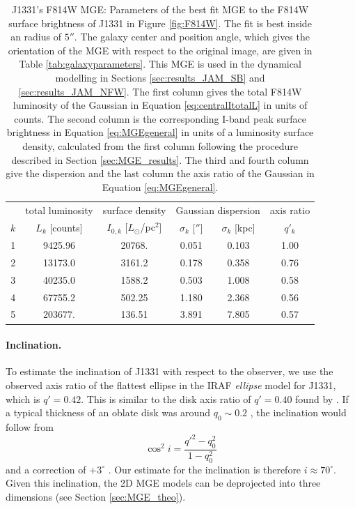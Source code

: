 \begin{table}
\centering
\caption{J1331's F814W MGE: Parameters of the best fit MGE to the F814W surface brightness of J1331 in Figure \ref{fig:F814W}. The fit is best inside an radius of $5''$. The galaxy center and position angle, which gives the orientation of the MGE with respect to the original image, are given in Table \ref{tab:galaxyparameters}. This MGE is used in the dynamical modelling in Sections \ref{sec:results_JAM_SB} and \ref{sec:results_JAM_NFW}.  The first column gives the total F814W luminosity of the Gaussian in Equation \eqref{eq:centralItotalL} in units of counts. The second column is the corresponding I-band peak surface brightness in Equation \eqref{eq:MGEgeneral} in units of a luminosity surface density, calculated from the first column following the procedure described in Section \ref{sec:MGE_results}. The third and fourth column give the dispersion and the last column the axis ratio of the Gaussian in Equation \eqref{eq:MGEgeneral}.}
\begin{tabular}{cccccc}
\hline
 & total luminosity  & surface density & \multicolumn{2}{c}{Gaussian dispersion} & axis ratio\\
$k$  & $L_k$ [counts] & $I_{0,k}$ [$L_\odot$/pc$^2$] & $\sigma_k$ [$''$] & $\sigma_k$ [kpc] & $q'_k$\\\hline
1  &     9425.96 &      20768.  &  0.051   & 0.103  & 1.00\\
2  &    13173.0 &        3161.2 &  0.178   & 0.358  & 0.76\\
3  &    40235.0 &        1588.2 &  0.503   & 1.008  & 0.58\\
4  &    67755.2 &         502.25&  1.180   & 2.368  & 0.56\\
5  &    203677. &         136.51&  3.891   & 7.805  & 0.57\\\hline
\end{tabular}
\label{tab:MGEF814W}
\end{table}

\paragraph{Inclination.} To estimate the inclination of J1331 with respect to the observer, we use the observed axis ratio of the flattest ellipse in the IRAF \emph{ellipse} model for J1331, which is $q'=0.42$. This is similar to the disk axis ratio of $q' = 0.40$ found by \citet{SWELLSI}. If a typical thickness of an oblate disk was around $q_0 \sim 0.2$ \citep{1958MeLu2.136....1H}, the inclination would follow from 
\begin{equation*}
\cos^2 i = \frac{q'^2 - q_0^2}{1 - q_0^2}
\end{equation*}
and a correction of $+3^\circ$ \citep{1988ngc..book.....T}. Our estimate for the inclination is therefore $i \approx 70^\circ$. Given this inclination, the 2D MGE models can be deprojected into three dimensions (see Section \ref{sec:MGE_theo}).

